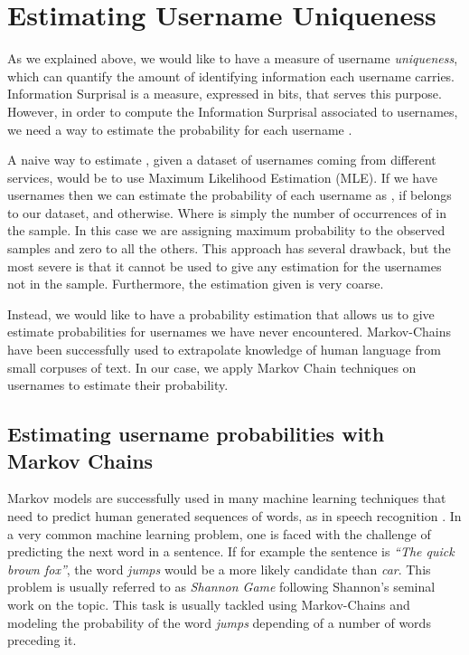 \documentclass[letterpaper]{sig-alternate}
\begin{document}
\section{Estimating Username Uniqueness}
\label{unique}

As we explained above, we would like to have a measure of username {\em uniqueness},
which can quantify the amount of identifying information each username carries.
Information Surprisal is a measure, expressed in bits, that serves this 
purpose.
However, in order to compute the Information Surprisal associated to usernames, we need
a way to estimate the probability  for each username .

A naive way to estimate , given a dataset of
usernames coming from different services, would be to use
Maximum Likelihood Estimation (MLE). If we have  usernames then we can
estimate the probability of each username  as , if 
belongs to our dataset, and  otherwise.  Where  is simply the
number of occurrences of  in the sample. In this case we are assigning
maximum probability to the observed samples and zero to all the others.
This approach has several drawback, but the most severe is that
it cannot be used to give any estimation for the usernames not in the sample.
Furthermore, the estimation given is very coarse.

Instead, we would like to have a probability estimation that allows us to give
estimate probabilities for usernames we have never encountered. 
 Markov-Chains
have been successfully used to extrapolate knowledge of human language from small
corpuses of text. In our case, we apply Markov Chain techniques on usernames
to estimate their probability.

\subsection{Estimating username probabilities with \\ Markov Chains}



Markov models are successfully used in many machine learning techniques that
need to predict human generated sequences of words, as in speech recognition
\cite{stat_nlp}. In a very common machine learning problem, one is faced with
the challenge of predicting the next word in a sentence. If for example the
sentence is {\em ``The quick brown fox''}, the word {\em jumps} would be a more
likely candidate than {\em car}. This problem is usually referred to as {\em
Shannon Game} following Shannon's seminal work on the topic\cite{shannon51}.  This
task is usually tackled using Markov-Chains and modeling the probability of the word
{\em jumps} depending of a number of words preceding it.
\end{document}
